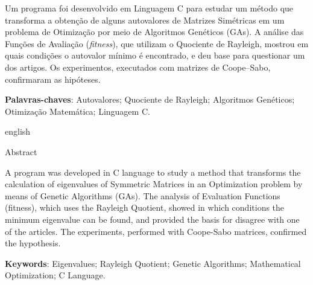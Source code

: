 \thispagestyle{empty}
\begin{resumo}
Um programa foi desenvolvido em Linguagem C para estudar um método que transforma a obtenção de alguns autovalores de Matrizes Simétricas em um problema de Otimização por meio de Algoritmos Genéticos (GAs). A análise das Funções de Avaliação (\emph{fitness}), que utilizam o Quociente de Rayleigh, mostrou em quais condições o autovalor mínimo é encontrado, e deu base para questionar um dos artigos. Os experimentos, executados com matrizes de Coope--Sabo, confirmaram as hipóteses. 
     
    \vspace{\onelineskip}

    \noindent\textbf{Palavras-chaves}: Autovalores; Quociente de Rayleigh; Algoritmos Genéticos; Otimização Matemática; Linguagem C.

    \vspace{\onelineskip}
    \vspace{\onelineskip}
		
    \begin{otherlanguage*}{english}
    \begin{center}{\ABNTEXchapterfont\huge Abstract}\end{center}
    
    A program was developed in C language to study a method that transforms the calculation of eigenvalues of Symmetric Matrices in an Optimization problem by means of Genetic Algorithms (GAs). The analysis of Evaluation Functions (fitness), which uses the Rayleigh Quotient, showed in which conditions the minimum eigenvalue can be found, and provided the basis for disagree with one of the articles. The experiments, performed with Coope-Sabo matrices, confirmed the hypothesis.
		
    \vspace{\onelineskip}

    \noindent\textbf{Keywords}: Eigenvalues; Rayleigh Quotient; Genetic Algorithms; Mathematical Optimization; C Language.

    \end{otherlanguage*}
		
    


		
\end{resumo}

